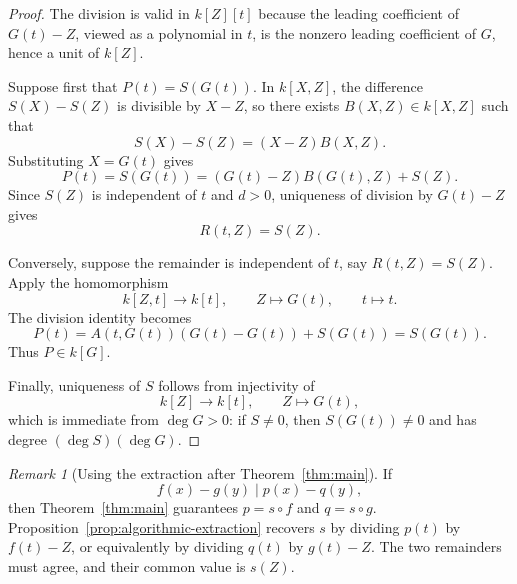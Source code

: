 \documentclass[11pt]{article}
\theoremstyle{plain}
\theoremstyle{definition}
\theoremstyle{remark}
\newtheorem{remark}[theorem]{Remark}
\begin{document}
\begin{proof}
The division is valid in \(k[Z][t]\) because the leading coefficient of \(G(t)-Z\), viewed as a polynomial in \(t\), is the nonzero leading coefficient of \(G\), hence a unit of \(k[Z]\).

Suppose first that \(P(t)=S(G(t))\). In \(k[X,Z]\), the difference \(S(X)-S(Z)\) is divisible by \(X-Z\), so there exists \(B(X,Z)\in k[X,Z]\) such that
\[
    S(X)-S(Z)=(X-Z)B(X,Z).
\]
Substituting \(X=G(t)\) gives
\[
    P(t)=S(G(t))=(G(t)-Z)B(G(t),Z)+S(Z).
\]
Since \(S(Z)\) is independent of \(t\) and \(d>0\), uniqueness of division by \(G(t)-Z\) gives
\[
    R(t,Z)=S(Z).
\]

Conversely, suppose the remainder is independent of \(t\), say \(R(t,Z)=S(Z)\). Apply the homomorphism
\[
    k[Z,t]\longrightarrow k[t],
    \qquad
    Z\longmapsto G(t),
    \qquad
    t\longmapsto t.
\]
The division identity becomes
\[
    P(t)=A(t,G(t))(G(t)-G(t))+S(G(t))=S(G(t)).
\]
Thus \(P\in k[G]\).

Finally, uniqueness of \(S\) follows from injectivity of
\[
    k[Z]\longrightarrow k[t],
    \qquad
    Z\longmapsto G(t),
\]
which is immediate from \(\deg G>0\): if \(S\neq 0\), then \(S(G(t))\neq 0\) and has degree \((\deg S)(\deg G)\).
\end{proof}

\begin{remark}[Using the extraction after Theorem~\ref{thm:main}]
If
\[
    f(x)-g(y)
    \mid
    p(x)-q(y),
\]
then Theorem~\ref{thm:main} guarantees \(p=s\circ f\) and \(q=s\circ g\). Proposition~\ref{prop:algorithmic-extraction} recovers \(s\) by dividing \(p(t)\) by \(f(t)-Z\), or equivalently by dividing \(q(t)\) by \(g(t)-Z\). The two remainders must agree, and their common value is \(s(Z)\).
\end{remark}
\end{document}
